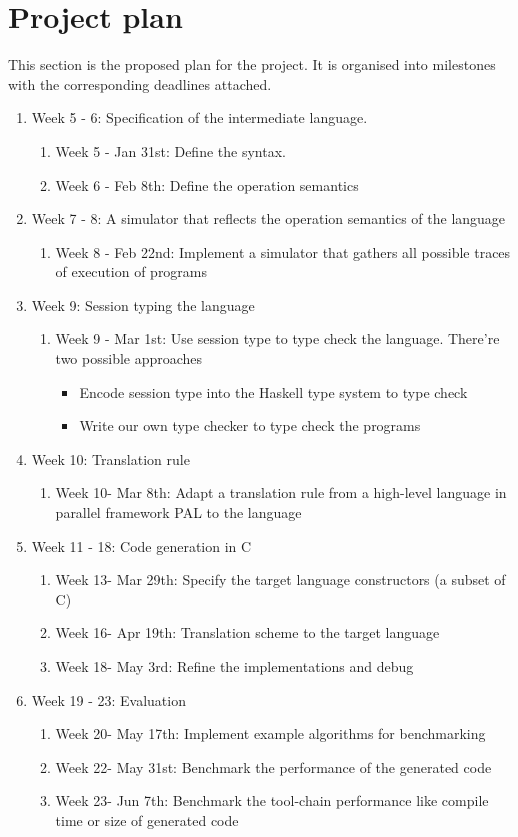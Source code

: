 \chapter{Project plan} \label{plan}
This section is the proposed plan for the project. It is organised into milestones with the corresponding deadlines attached.
\begin{enumerate}
\item Week 5 - 6: Specification of the intermediate language.
\begin{enumerate}
    \item Week 5 - Jan 31st: Define the syntax.  
    \item Week 6 - Feb 8th: Define the operation semantics
\end{enumerate}
\item Week 7 - 8: A simulator that reflects the operation semantics of the language
\begin{enumerate}
    \item Week 8 - Feb 22nd: Implement a simulator that gathers all possible traces of execution of programs
\end{enumerate}
\item Week 9: Session typing the language
\begin{enumerate}
    \item Week 9 - Mar 1st: Use session type to type check the language. There're two possible approaches
    \begin{itemize}
        \item Encode session type into the Haskell type system to type check 
        \item Write our own type checker to type check the programs
    \end{itemize} 
\end{enumerate}
\item Week 10: Translation rule 
\begin{enumerate}
    \item Week 10- Mar 8th: Adapt a translation rule from a high-level language in parallel framework PAL to the language
\end{enumerate}
\item Week 11 - 18: Code generation in C
\begin{enumerate}
    \item Week 13- Mar 29th: Specify the target language constructors (a subset of C)
    \item Week 16- Apr 19th: Translation scheme to the target language
    \item Week 18- May 3rd: Refine the implementations and debug
\end{enumerate}
\item Week 19 - 23: Evaluation
\begin{enumerate}
    \item Week 20- May 17th: Implement example algorithms for benchmarking
    \item Week 22- May 31st: Benchmark the performance of the generated code
    \item Week 23- Jun 7th: Benchmark the tool-chain performance like compile time or size of generated code
\end{enumerate}
\end{enumerate}